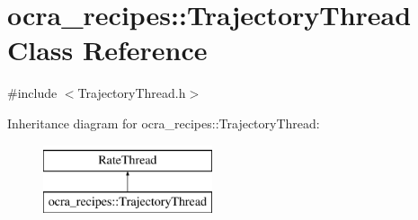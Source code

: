 \hypertarget{classocra__recipes_1_1TrajectoryThread}{}\section{ocra\+\_\+recipes\+:\+:Trajectory\+Thread Class Reference}
\label{classocra__recipes_1_1TrajectoryThread}


{\ttfamily \#include $<$Trajectory\+Thread.\+h$>$}

Inheritance diagram for ocra\+\_\+recipes\+:\+:Trajectory\+Thread\+:\begin{figure}[H]
\begin{center}
\leavevmode
\includegraphics[height=2.000000cm]{d0/d2a/classocra__recipes_1_1TrajectoryThread}
\end{center}
\end{figure}
